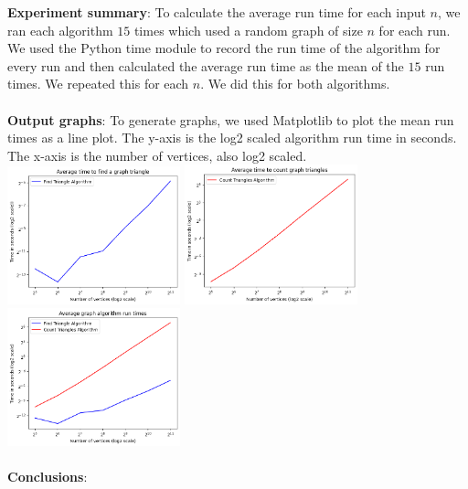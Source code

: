 \documentclass[12pt, letterpaper]{article}
\begin{document}
\begin{enumerate}
    \textbf{Experiment summary}: To calculate the average run time for each input $n$, we ran each algorithm $15$ times which used a random graph of size $n$ for each run. We used the Python time module to record the run time of the algorithm for every run and then calculated the average run time as the mean of the $15$ run times. We repeated this for each $n$. We did this for both algorithms.
    \\\\
    \textbf{Output graphs}: To generate graphs, we used Matplotlib to plot the mean run times as a line plot. The y-axis is the log2 scaled algorithm run time in seconds. The x-axis is the number of vertices, also log2 scaled.\\  
    \includegraphics[width=50mm]{src/graph 1.png}
    \includegraphics[width=50mm]{src/graph 2.png}\\
    \includegraphics[width=50mm]{src/graph 3.png}
    \\\\
    \textbf{Conclusions}:\\

\end{enumerate}
\end{document}
